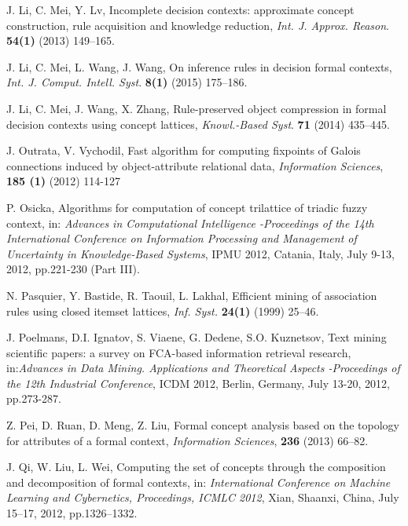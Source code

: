 \documentclass[11pt]{article}
\numberwithin{equation}{subsection}
\begin{document}
\begin{thebibliography}{aa}
J. Li, C. Mei, Y. Lv, Incomplete decision contexts: approximate concept construction, rule acquisition and knowledge reduction, \textit{Int. J. Approx. Reason}. \textbf{54(1)} (2013) 149--165.


 J. Li, C. Mei, L. Wang, J. Wang, On inference rules in decision formal contexts, \textit{Int. J. Comput. Intell. Syst}. \textbf{8(1)} (2015) 175--186.

J. Li, C. Mei, J. Wang, X. Zhang, Rule-preserved object compression in formal decision contexts using concept lattices, \textit{Knowl.-Based Syst}.\textbf{ 71} (2014) 435--445.

J. Outrata, V. Vychodil,
Fast algorithm for computing fixpoints of Galois connections induced by object-attribute relational data,
\textit{Information Sciences}, \textbf{185 (1)} (2012) 114-127



P. Osicka, Algorithms for computation of concept trilattice of triadic fuzzy context, in:\textit{ Advances in Computational Intelligence -Proceedings of the 14th International Conference on Information Processing and Management of Uncertainty in Knowledge-Based Systems}, IPMU 2012, Catania, Italy, July 9-13, 2012, pp.221-230 (Part III).


N. Pasquier, Y. Bastide, R. Taouil, L. Lakhal, Efficient mining of association rules using closed itemset lattices, \textit{Inf. Syst.} \textbf{24(1)} (1999) 25--46.


J. Poelmans, D.I. Ignatov, S. Viaene, G. Dedene, S.O. Kuznetsov, Text mining scientific papers: a survey on FCA-based information retrieval research, in:\textit{Advances in Data Mining. Applications and Theoretical Aspects -Proceedings of the 12th Industrial Conference}, ICDM 2012, Berlin, Germany, July 13-20,  2012, pp.273-287.



Z. Pei, D. Ruan, D. Meng, Z. Liu, Formal concept analysis based on the topology for attributes of a formal context, \textit{Information Sciences},  \textbf{236} (2013) 66--82.




J. Qi, W. Liu, L. Wei, Computing the set of concepts through the composition and decomposition of formal contexts, in: \textit{International Conference on Machine Learning and Cybernetics, Proceedings, ICMLC 2012}, Xian, Shaanxi, China, July 15--17,  2012, pp.1326--1332.


\end{thebibliography}
\end{document}
